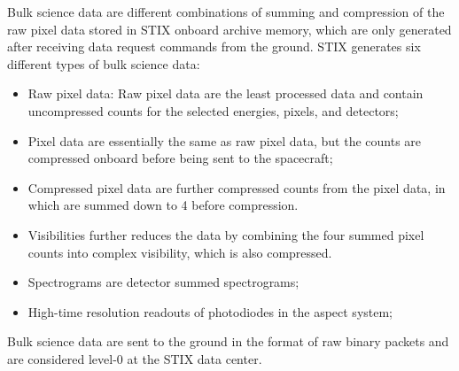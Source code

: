 \documentclass[referee]{aa} %
\begin{document}
Bulk science data are different combinations of summing and compression of the raw pixel data stored in STIX 
onboard archive memory, which are only generated after receiving data request commands from the ground. 
STIX generates six different types of bulk science data: 
\begin{itemize}
 \item Raw pixel data: Raw pixel data are the least processed data and contain
  uncompressed counts for the selected energies, pixels, and detectors; 
\item Pixel data are essentially the same as raw pixel data, 
but the counts are compressed onboard before being sent to the spacecraft;
\item Compressed pixel data are further compressed counts from the pixel data,
 in which are summed down to 4 before compression.
\item Visibilities further reduces the data by combining the four summed pixel counts into complex visibility, 
which is also compressed.
\item Spectrograms are detector summed spectrograms; 
\item High-time resolution readouts of photodiodes in the aspect system;
\end{itemize}
Bulk science data are sent to the ground in the format of raw binary packets and  are
considered level-0 at the STIX data center.  


\end{document}
